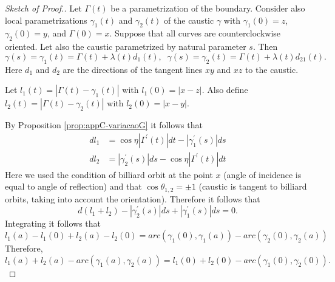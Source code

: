    \begin{proof} [Sketch of Proof.] Let  $\Gamma(t)$  be a  parametrization of the boundary. Consider also local parametrizations   $\gamma_1(t)$ and $\gamma_2(t)$ of the caustic $\gamma$  with $\gamma_1(0)=z$, $\gamma_2(0)=y$, and $\Gamma(0)=x$. Suppose that all curves are   counterclockwise oriented.
   Let also the caustic parametrized by natural parameter $s$. Then
   \[\gamma(s)=\gamma_1(t)=\Gamma(t)+\lambda(t) d_1(t), \;\;\gamma(s)=\gamma_2(t)=\Gamma(t)+\lambda(t) d_21(t).\]
   Here $d_1$ and $d_2$ are the directions of the tangent lines $xy$ and $xz$ to the caustic.
   
   Let $l_1(t)= |\Gamma(t)-\gamma_1(t)|$ with $l_1(0)=|x-z|$. Also define $l_2(t)= |\Gamma(t)-\gamma_2(t)|$ with $l_2(0)=|x-y|$.
   
   By Proposition \ref{prop:appC-variacaoG} it follows that
   \begin{align*}
   dl_1 &=\cos\eta |\Gamma^\prime(t)|dt-|\gamma_1^\prime(s)|ds\\
    dl_2 &=|\gamma_2^\prime(s)|ds-\cos\eta |\Gamma^\prime(t)|dt
   \end{align*}
   Here we used   the condition of billiard orbit at the point $x$ (angle of incidence is equal to angle of reflection) and that $\cos\theta_{1,2}=\pm 1$ (caustic is tangent to billiard orbits, taking into account     the orientation).
   Therefore it follows that
   \[d(l_1+l_2)-|\gamma_2^\prime(s)|ds+|\gamma_1^\prime(s)|ds=0.\]
   Integrating it follows that
   \[l_1(a)-l_1(0)+l_2(a)-l_2(0)=arc(\gamma_1(0),\gamma_1(a))-arc(\gamma_2(0),\gamma_2(a))\]
   Therefore,
   \[l_1(a)+l_2(a)-arc(\gamma_1(a),\gamma_2(a))=l_1(0)+l_2(0)-arc(\gamma_1(0),\gamma_2(0)).\]
   
   
   \end{proof}